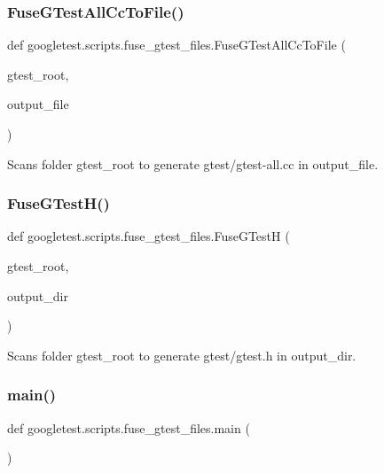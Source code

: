 \subsubsection{\texorpdfstring{FuseGTestAllCcToFile()}{FuseGTestAllCcToFile()}}
{\footnotesize\ttfamily def googletest.\+scripts.\+fuse\+\_\+gtest\+\_\+files.\+Fuse\+G\+Test\+All\+Cc\+To\+File (\begin{DoxyParamCaption}\item[{}]{gtest\+\_\+root,  }\item[{}]{output\+\_\+file }\end{DoxyParamCaption})}

\begin{DoxyVerb}Scans folder gtest_root to generate gtest/gtest-all.cc in output_file.\end{DoxyVerb}
 \mbox{\label{namespacegoogletest_1_1scripts_1_1fuse__gtest__files_aa5cbce61df344569a4b8c9804e978c00}} 
\subsubsection{\texorpdfstring{FuseGTestH()}{FuseGTestH()}}
{\footnotesize\ttfamily def googletest.\+scripts.\+fuse\+\_\+gtest\+\_\+files.\+Fuse\+G\+TestH (\begin{DoxyParamCaption}\item[{}]{gtest\+\_\+root,  }\item[{}]{output\+\_\+dir }\end{DoxyParamCaption})}

\begin{DoxyVerb}Scans folder gtest_root to generate gtest/gtest.h in output_dir.\end{DoxyVerb}
 \mbox{\label{namespacegoogletest_1_1scripts_1_1fuse__gtest__files_ade0ad805b2d0c8003c2edd2951af846f}} 
\subsubsection{\texorpdfstring{main()}{main()}}
{\footnotesize\ttfamily def googletest.\+scripts.\+fuse\+\_\+gtest\+\_\+files.\+main (\begin{DoxyParamCaption}{ }\end{DoxyParamCaption})}

